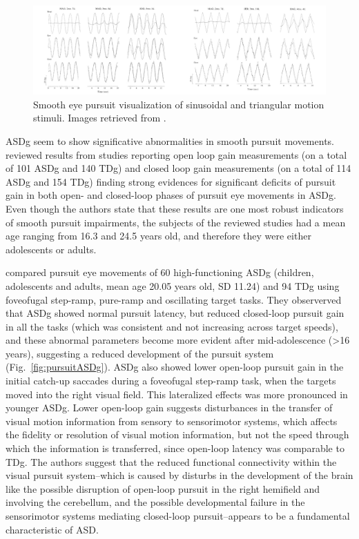 \begin{figure}[h]
  \centering
  \includegraphics[width=1\textwidth]{figures/sinetriangular.jpg}
  \caption[Sinusoidal and triangular motion recordings]{Smooth eye pursuit visualization of sinusoidal and triangular motion stimuli. Images retrieved from \cite{vonhofsten1997smoothpursuit}.}
  \label{fig:sinetriangle}
\end{figure}

ASDg seem to show significative abnormalities in smooth pursuit movements. \cite{johnson2016review} reviewed results from studies reporting open loop gain measurements (on a total of 101 ASDg and 140 TDg) and closed loop gain measurements (on a total of 114 ASDg and 154 TDg) finding strong evidences for significant deficits of pursuit gain in both open- and closed-loop phases of pursuit eye movements in ASDg. Even though the authors state that these results are one most robust indicators of smooth pursuit impairments, the subjects of the reviewed studies had a mean age ranging from 16.3 and 24.5 years old, and therefore they were either adolescents or adults.

\cite{takarae2004smoothpursuit} compared pursuit eye movements of 60 high-functioning ASDg (children, adolescents and adults, mean age 20.05 years old, SD 11.24) and 94 TDg using foveofugal step-ramp, pure-ramp and oscillating target tasks. They observerved that ASDg showed normal pursuit latency, but reduced closed-loop pursuit gain in all the tasks (which was consistent and not increasing across target speeds), and these abnormal parameters become more evident after mid-adolescence (>16 years), suggesting a reduced development of the pursuit system  (Fig.~\ref{fig:pursuitASDg}). ASDg also showed lower open-loop pursuit gain in the initial catch-up saccades during a foveofugal step-ramp task, when the targets moved into the right visual field. This lateralized effects was more pronounced in younger ASDg. 
Lower open-loop gain suggests disturbances in the transfer of visual motion information from sensory to sensorimotor systems, which affects the fidelity or resolution of visual motion information, but not the speed through which the information is transferred, since open-loop latency was comparable to TDg.
The authors suggest that the reduced functional connectivity within the visual pursuit system–which is caused by disturbs in the development of the brain like the possible disruption of open-loop pursuit in the right hemifield and involving the cerebellum, and the possible developmental failure in the sensorimotor systems mediating closed-loop pursuit–appears to be a fundamental characteristic of ASD.

